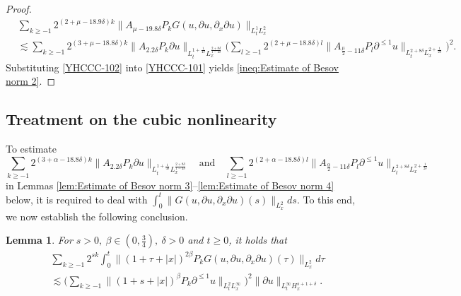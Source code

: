 \documentclass[11pt,twoside]{article}
\def\f{\frac}
\def\p{\partial}
\def\ls{\lesssim}
\theoremstyle{plain}
\newtheorem{lemma}[theorem]{Lemma}
\theoremstyle{definition}
\numberwithin{equation}{section}
\begin{document}
\begin{proof}
\begin{equation}\label{YHCCC-102}
\begin{split}
	&\sum_{k\ge -1}2^{(2 +\mu -18.9\delta) k}\|A_{\mu-19.8\delta}
	P_k G(u,\p u,\p_x\p u)\|_{L^1_tL^2_x}\\
	&\ls
	\sum_{k\ge -1}2^{(3 +\mu -18.8\delta) k}\|A_{2.2\delta} P_{k}\p u\|_{L_t^{1+\f{1}{4\delta}}L^{\f{2+8\delta}{1-4\delta}}_x}
	\big(\sum_{l\ge-1}2^{(2 +\mu -18.8\delta) l} \|A_{\f{\mu}{2}-11\delta}P_{l}\p^{\le 1} u\|_{L_t^{2+8\delta}L^{2+\f{1}{2\delta}}_x}\big)^2.
\end{split}
\end{equation}
Substituting \eqref{YHCCC-102} into \eqref{YHCCC-101} yields \eqref{ineq:Estimate of Besov norm 2}.
\end{proof}


\subsection{Treatment on the cubic nonlinearity}
To estimate
	\[
	\sum_{k\ge -1}2^{(3 +\alpha -18.8\delta) k}\|A_{2.2\delta} P_{k}\p u\|_{L_t^{1+\f{1}{4\delta}}L^{\f{2+8\delta}{1-4\delta}}_x}
	\quad \text{and} \quad
	\sum_{l\ge-1}2^{(2 +\alpha -18.8\delta) l} \|A_{\f{\alpha}{2}-11\delta}P_{l}\p^{\le 1} u\|_{L_t^{2+8\delta}L^{2+\f{1}{2\delta}}_x}
	\]
	in Lemmas \ref{lem:Estimate of Besov norm 3}--\ref{lem:Estimate of Besov norm 4} below, it is required to deal with
	$\int_0^t \|G(u,\p u, \p_x\p u)(s)\|_{L^2_x} ds$. To this end, we now establish the following conclusion.
\begin{lemma}\label{lem:weight and Exponent Allocation for the Cubic Nonlinear Term}
	For $s>0,\ \beta\in(0,\f34),\ \delta>0$ and $t\ge0$, it holds that
	\begin{equation}\label{YHCCC-35}
		\begin{aligned}
			&\sum_{k\ge -1} 2^{sk}\int_{0}^{t}\big\|(1+\tau+|x|)^{2\beta}P_k G(u,\partial u,\p_x\p u)(\tau)\big\|_{L^2_x}d\tau\\
			&\ls
			\big( \sum_{k\ge -1}\|(1+s+|x|)^{\beta}P_k\p^{\le 1} u\|_{L^{2}_tL^\infty_x}\big)^2
			\|\p u\|_{L^\infty_tH^{s+1+\delta}_x}.
		\end{aligned}
	\end{equation}
\end{lemma}
\end{document}
